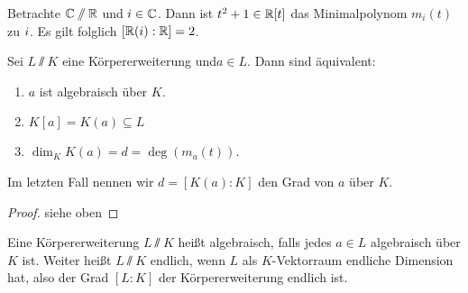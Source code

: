 \documentclass[12pt,a4paper]{scrartcl}
\begin{document}
\begin{bsp}
	Betrachte $\mathbb C\sslash\mathbb R$ und $i\in\mathbb C$. Dann ist $t^2+1\in \mathbb R[t]$ das Minimalpolynom $m_i(t)$ zu $i$. Es gilt folglich $[\mathbb R(i):\mathbb R] = 2$.
\end{bsp}

\begin{satz}\label{thm:algebraisch_aequivalenzen}
	Sei $L\sslash K$ eine Körpererweiterung und$a\in L$. Dann sind äquivalent:
	\begin{enumerate}
		\item $a$ ist algebraisch über $K$.
		\item $K[a] = K(a) \subseteq L$
		\item $\dim_KK(a) = d = \deg(m_a(t))$.
	\end{enumerate}
	Im letzten Fall nennen wir $ d = [K(a):K]$ den Grad von $a$ über $K$.
\end{satz}
\begin{proof}
	siehe oben
\end{proof}
\begin{defi}
	Eine Körpererweiterung $L\sslash K$ heißt algebraisch, falls jedes $a\in L$ algebraisch über $K$ ist. Weiter heißt $L\sslash K$ endlich, wenn $L$ als $K$-Vektorraum endliche Dimension hat, also der Grad $[L:K]$ der Körpererweiterung endlich ist.
\end{defi}	
	
\end{document}
